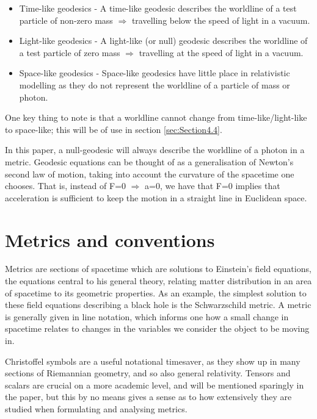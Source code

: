 \documentclass[oneside,openright,frontopenright, singlespacing]{dmathesis}
\begin{document}
\vspace{1em}
\begin{itemize}
  \item Time-like geodesics - A time-like geodesic describes the worldline of a test particle of non-zero mass $\Rightarrow$ travelling below the speed of light in a vacuum.
  \item Light-like geodesics - A light-like (or null) geodesic describes the worldline of a test particle of zero mass $\Rightarrow$ travelling at the speed of light in a vacuum.
  \item Space-like geodesics - Space-like geodesics have little place in relativistic modelling as they do not represent the worldline of a particle of mass or photon.
\end{itemize}

\vspace{1em}
	One key thing to note is that a worldline cannot change from time-like/light-like to space-like; this will be of use in section \ref{sec:Section4.4}.

\vspace{1em}
	 In this paper, a null-geodesic will always describe the worldline of a photon in a metric. Geodesic equations can be thought of as a generalisation of Newton's second law of motion, taking into account the curvature of the spacetime one chooses. That is, instead of F=0 $\Rightarrow$ a=0, we have that F=0 implies that acceleration is sufficient to keep the motion in a straight line in Euclidean space.

\section{Metrics and conventions}\label{sec:Section2.3}

\vspace{1em}
	Metrics are sections of spacetime which are solutions to Einstein’s field equations, the equations central to his general theory, relating matter distribution in an area of spacetime to its geometric properties. As an example, the simplest solution to these field equations describing a black hole is the Schwarzschild metric. A metric is generally given in line notation, which informs one how a small change in spacetime relates to changes in the variables we consider the object to be moving in.

\vspace{1em}
	Christoffel symbols are a useful notational timesaver, as they show up in many sections of Riemannian geometry, and so also general relativity. Tensors and scalars are crucial on a more academic level, and will be mentioned sparingly in the paper, but this by no means gives a sense as to how extensively they are studied when formulating and analysing metrics.
\end{document}
